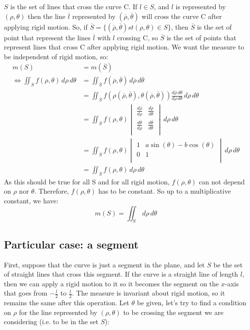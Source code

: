 \documentclass[a4paper]{article}
\begin{document}
$S$ is the set of lines that cross the curve C.
If $l \in S$, and $l$ is represented by $(\rho, \theta)$ then the line $\overline{l}$ represented by $(\overline{\rho}, \overline{\theta})$ will cross the curve C after applying rigid motion.
So, if $\overline{S}=\{(\overline{\rho}, \overline{\theta}) st (\rho, \theta) \in S \}$, then $\overline{S}$ is the set of point that represent the lines $\overline{l}$ with $l$ crossing C, so $\overline{S}$ is the set of points that represent lines that cross C after applying rigid motion.
\smallbreak
We want the measure to be independent of rigid motion, so:
\begin{align}
m(S) &= m(\overline{S}) \\
\Leftrightarrow \iint_S f(\rho,\theta) \,d\rho\,d\theta &= \iint_{\overline{S}} f(\overline{\rho},\overline{\theta}) \,d\overline{\rho}\,d\overline{\theta} \\
&= \iint_{\overline{S}} f(\rho (\overline{\rho},\overline{\theta}), \theta (\overline{\rho},\overline{\theta}))   \frac{ d\overline{\rho} \, d\overline{\theta} }{ d\rho \, d\theta }    \,d\rho \,d\theta \\
&= \iint_{\overline{S}} f(\rho, \theta) 
\begin{vmatrix} %
\frac{d\overline{\rho}}{d\rho} & \frac{d\overline{\rho}}{d\theta} \\ 
\frac{d\overline{\theta}}{d\rho} & \frac{d\overline{\theta}}{d\theta} \\ 
\end{vmatrix} 
\,d\rho \,d\theta \\
&= \iint_{\overline{S}} f(\rho, \theta) 
\begin{vmatrix} %
 1 & a\sin(\theta) - b\cos(\theta) \\ 
 0 &  1 \\ 
\end{vmatrix} 
\,d\rho \,d\theta \\
&= \iint_{\overline{S}} f(\rho, \theta) \,d\rho \,d\theta
\end{align}
As this should be true for all S and for all rigid motion, $f(\rho,\theta)$ can not depend on $\rho$ nor $\theta$. 
Therefore, $f(\rho,\theta)$ has to be constant. So up to a multiplicative constant, we have:
$$m(S)=\iint_S \,d\rho\,d\theta$$

\subsection{Particular case: a segment}
First, suppose that the curve is just a segment in the plane, and let $S$ be the set of straight lines that cross this segment.
If the curve is a straight line of length $l$, then we can apply a rigid motion to it so it becomes the segment on the $x$-axis that goes from $-\frac{l}{2}$ to $\frac{l}{2}$. The measure is invariant about rigid motion, so it remains the same after this operation.
Let $\theta$ be given, let's try to find a condition on $\rho$ for the line represented by $(\rho, \theta)$ to be crossing the segment we are considering (i.e. to be in the set $S$):
\end{document}
